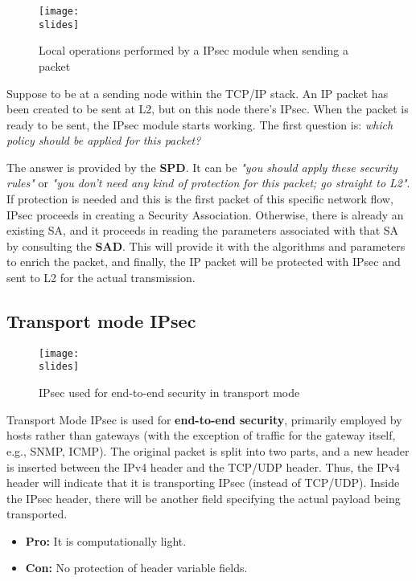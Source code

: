 \begin{figure}[h]
    \centering
    \texttt{[image: \\slides]}
    \caption{Local operations performed by a IPsec module when sending a packet}
\end{figure}

Suppose to be at a sending node within the TCP/IP stack. An IP packet has been created to be sent at L2, but on this node there's IPsec. When the packet is ready to be sent, the IPsec module starts working. The first question is: \textit{which policy should be applied for this packet?}

The answer is provided by the \textbf{SPD}. It can be \textit{"you should apply these security rules"} or \textit{"you don't need any kind of protection for this packet; go straight to L2"}.
If protection is needed and this is the first packet of this specific network flow, IPsec proceeds in creating a Security Association. Otherwise, there is already an existing SA, and it proceeds in reading the parameters associated with that SA by consulting the \textbf{SAD}. This will provide it with the algorithms and parameters to enrich the packet, and finally, the IP packet will be protected with IPsec and sent to L2 for the actual transmission.



\subsection{Transport mode IPsec}
\begin{figure}[h]
    \centering
    \texttt{[image: \\slides]}
    \caption{IPsec used for end-to-end security in transport mode}
\end{figure}

Transport Mode IPsec is used for \textbf{end-to-end security}, primarily employed by hosts rather than gateways (with the exception of traffic for the gateway itself, e.g., SNMP, ICMP). The original packet is split into two parts, and a new header is inserted between the IPv4 header and the TCP/UDP header. Thus, the IPv4 header will indicate that it is transporting IPsec (instead of TCP/UDP). Inside the IPsec header, there will be another field specifying the actual payload being transported.
\begin{itemize}
    \item \textbf{Pro:} It is computationally light.
    \item \textbf{Con:} No protection of header variable fields.
\end{itemize}


